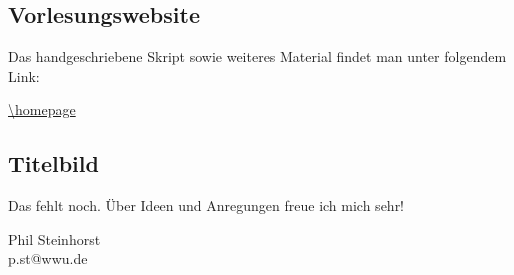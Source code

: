 \subsection*{Vorlesungswebsite}
\label{sub:link}
Das handgeschriebene Skript sowie weiteres Material findet man unter folgendem Link:
\begin{center}
	\url{\homepage}
\end{center}

\subsection*{Titelbild}
\label{sub:titlepic}
Das fehlt noch. Über Ideen und Anregungen freue ich mich sehr!

\vfill
\begin{flushright}
	Phil Steinhorst \\
	p.st@wwu.de
\end{flushright}
\newpage